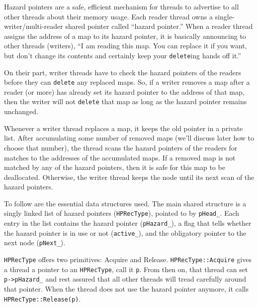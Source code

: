 \documentclass[a4paper,12pt,notitlepage,twoside,openright]{article}
\begin{document}
Hazard pointers are a safe, efficient mechanism for threads to advertise to all other threads about their memory usage. Each reader thread owns a single-writer/multi-reader shared pointer called ``hazard pointer.'' When a reader thread assigns the address of a map to its hazard pointer, it is basically announcing to other threads (writers), ``I am reading this map. You can replace it if you want, but don't change its contents and certainly keep your \texttt{delete}ing hands off it.''

On their part, writer threads have to check the hazard pointers of the readers before they can \texttt{delete} any replaced maps. So, if a writer removes a map after a reader (or more) has already set its hazard pointer to the address of that map, then the writer will not \texttt{delete} that map as long as the hazard pointer remains unchanged.

Whenever a writer thread replaces a map, it keeps the old pointer in a private list. After accumulating some number of removed maps (we'll discuss later how to choose that number), the thread scans the hazard pointers of the readers for matches to the addresses of the accumulated maps. If a removed map is not matched by any of the hazard pointers, then it is safe for this map to be deallocated. Otherwise, the writer thread keeps the node until its next scan of the hazard pointers.

To follow are the essential data structures used. The main shared structure is a singly linked list of hazard pointers (\texttt{HPRecType}), pointed to by \texttt{pHead\_}. Each entry in the list contains the hazard pointer (\texttt{pHazard\_}), a flag that tells whether the hazard pointer is in use or not (\texttt{active\_}), and the obligatory pointer to the next node (\texttt{pNext\_}).

\texttt{HPRecType} offers two primitives: Acquire and Release. \texttt{HPRecType::Acquire} gives a thread a pointer to an \texttt{HPRecType}, call it \texttt{p}. From then on, that thread can set \texttt{p->pHazard\_} and rest assured that all other threads will tread carefully around that pointer. When the thread does not use the hazard pointer anymore, it calls \texttt{HPRecType::Release(p)}.
\end{document}
